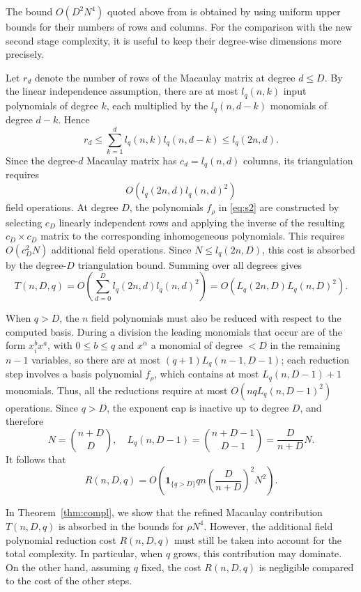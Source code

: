 \documentclass[a4paper, 12pt, oneside, openright]{article}
\begin{document}
The bound $O(D^2N^4)$ quoted above from \cite{ST} is obtained by using uniform upper bounds for their numbers of rows and columns. For the comparison with the new second stage complexity, it is useful to keep their degree-wise dimensions more precisely. 

Let $r_d$ denote the number of rows of the Macaulay matrix at degree $d\le D$. By the linear independence assumption, there are at most $l_q(n,k)$ input polynomials of degree $k$, each multiplied by the $l_q(n,d-k)$ monomials of degree $d-k$. Hence
\[
r_d\leq
\sum_{k=1}^{d}
l_q(n,k)l_q(n,d-k)
\leq l_q(2n,d).
\]
Since the degree-$d$ Macaulay matrix has $c_d=l_q(n,d)$ columns, its triangulation requires
\[
O\left(
l_q(2n,d)l_q(n,d)^2
\right)
\]
field operations. 
At degree $D$, the polynomials $f_\rho$ in \eqref{eq:s2} are constructed by selecting $c_D$ linearly independent rows and applying the inverse of the resulting $c_D\times c_D$  matrix to the corresponding inhomogeneous polynomials. This requires $O(c_D^2N)$ additional field operations. Since $N\le l_q(2n,D)$, this cost is absorbed by the degree-$D$ triangulation bound.
Summing over all degrees gives
\begin{equation}
\label{Mac_complexity}
T(n,D,q)=
O\left(
\sum_{d=0}^{D}
l_q(2n,d)l_q(n,d)^2
\right)=
O\left(
L_q(2n,D)L_q(n,D)^2
\right).
\end{equation}

When $q>D$, the $n$ field polynomials must also be reduced with respect to the computed basis. 
During a division the leading monomials that occur are of the form $x_i^b x^a$, with $0\le b\le q$ and $x^\alpha$ a monomial of degree $<D$ in the remaining $n-1$ variables, so there are at most $(q+1)L_q(n-1,D-1)$; each reduction step involves a basis polynomial $f_\rho$, which contains at most $L_q(n,D-1)+1 $ monomials. Thus, all the reductions require at most $O\left(nqL_q(n,D-1)^2\right)$ operations. Since $q>D$, the exponent cap is inactive up to degree $D$, and therefore
\[
N=
\binom{n+D}{D}
,
\quad
L_q(n,D-1)
=
\binom{n+D-1}{D-1}=
\frac{D}{n+D} N
.
\]
It follows that
\begin{equation}
\label{Red_complexity}
R(n,D,q)=
O\left(
\mathbf 1_{\{q>D\}}
qn\left(\frac{D}{n+D}\right)^2N^2
\right).
\end{equation}

In Theorem~\ref{thm:compl}, we show that the refined Macaulay contribution $T(n,D,q)$ is absorbed in the bounds for $\rho N^4$. However, the additional field polynomial reduction cost $R(n,D,q)$ must still be taken into account for the total complexity.
In particular, when $q$ grows, this contribution may dominate. On the other hand, assuming $q$ fixed, the cost  $R(n,D,q)$ is negligible compared to the cost of the other steps.
\end{document}
